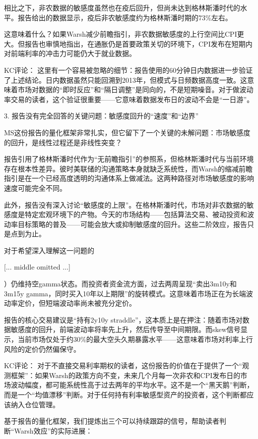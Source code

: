 \documentclass[11pt]{ctexart}
\begin{document}
相比之下，非农数据的敏感度虽然也在疫后回升，但尚未达到格林斯潘时代的水平。报告给出的数据显示，疫后非农敏感度约为格林斯潘时期的73\%左右。

这意味着什么？如果Warsh减少前瞻指引，非农数据敏感度的上行空间比CPI更大。但报告也审慎地指出，在通胀仍是首要政策关切的环境下，CPI发布在短期内对前端利率的冲击力可能仍大于就业数据。

KC评论： 这里有一个容易被忽略的细节：报告使用的60分钟日内数据进一步验证了上述结论。日内数据虽然只能回溯到2013年，但模式与日频数据高度一致。这意味着市场对数据的“即时反应”和“隔日调整”是同向的，不是短期噪音。对于做波动率交易的读者，这个验证很重要——它意味着数据发布日的波动不会是“一日游”。

3. 报告没有完全回答的关键问题：敏感度回升的“速度”和“边界”

MS这份报告的量化框架非常扎实，但它留下了一个关键的未解问题：市场敏感度的回升，是线性过程还是非线性突变？

报告引用了格林斯潘时代作为“无前瞻指引”的参照系，但格林斯潘时代与当前环境存在根本性差异。彼时美联储的沟通策略本身就缺乏系统性，而Warsh的缩减前瞻指引是在一个已经高度透明的沟通体系上做减法。这两种路径对市场敏感度的影响速度可能完全不同。

此外，报告没有深入讨论“敏感度的上限”。在格林斯潘时代，市场对非农数据的敏感度是特定宏观环境下的产物。今天的市场结构——包括算法交易、被动投资和波动率目标策略的普及——可能会放大或抑制敏感度的回升。这些二阶效应，报告只是点到为止。

对于希望深入理解这一问题的

[... middle omitted ...]

）仍维持空gamma状态。而投资者资金流方面，过去两周呈现“卖出3m10y和3m15y gamma，同时买入10年以上期限”的旋转模式。这意味着市场正在为长端波动率定价，但短端波动率尚未被充分定价。

报告的核心交易建议是“持有2y10y straddle”，这本质上是在押注：随着市场对数据敏感度的回升，前端波动率将率先上升，然后传导至中间期限。而skew信号显示，当前市场仅处于约30\%的最大空头久期暴露水平——这意味着市场对利率上行风险的定价仍然偏保守。

KC评论： 对于不直接交易利率期权的读者，这份报告的价值在于提供了一个“观测框架”：如果Warsh的政策方向不变，未来几个月每一次非农和CPI发布日的市场波动幅度，都可能系统性高于过去两年的平均水平。这不是一个“黑天鹅”判断，而是一个“均值漂移”判断。对于任何持有利率敏感型资产的投资者，这个判断都应该纳入仓位管理。

基于报告的量化框架，我们提炼出三个可以持续跟踪的信号，帮助读者判断“Warsh效应”的实际进展：
\end{document}
